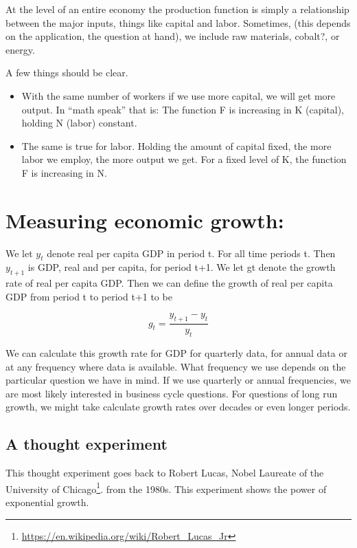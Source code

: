 \documentclass[
]{book}
\providecommand{\tightlist}{%
  \setlength{\itemsep}{0pt}\setlength{\parskip}{0pt}}
\begin{document}
At the level of an entire economy the production function is simply a relationship between the major inputs, things like capital and labor. Sometimes, (this depends on the application, the question at hand), we include raw materials, cobalt?, or energy.

A few things should be clear.

\begin{itemize}
\tightlist
\item
  With the same number of workers if we use more capital, we will get more output. In ``math speak'' that is: The function F is increasing in K (capital), holding N (labor) constant.\\
\item
  The same is true for labor. Holding the amount of capital fixed, the more labor we employ, the more output we get. For a fixed level of K, the function F is increasing in N.
\end{itemize}

\hypertarget{measuring-economic-growth}{%
\section{Measuring economic growth:}\label{measuring-economic-growth}}

We let \(y_t\) denote real per capita GDP in period t. For all time periods t. Then \(y_{t+1}\) is GDP, real and per capita, for period t+1. We let gt denote the growth rate of real per capita GDP. Then we can define the growth of real per capita GDP from period t to period t+1 to be

\[g_t = \frac{y_{t+1} - y_t}{y_t}\]

We can calculate this growth rate for GDP for quarterly data, for annual data or at any frequency where data is available. What frequency we use depends on the particular question we have in mind. If we use quarterly or annual frequencies, we are most likely interested in business cycle questions. For questions of long run growth, we might take calculate growth rates over decades or even longer periods.

\hypertarget{a-thought-experiment}{%
\subsection{A thought experiment}\label{a-thought-experiment}}

This thought experiment goes back to Robert Lucas, Nobel Laureate of the University of Chicago\footnote{\url{https://en.wikipedia.org/wiki/Robert_Lucas_Jr}}. from the 1980s. This experiment shows the power of exponential growth.
\end{document}
